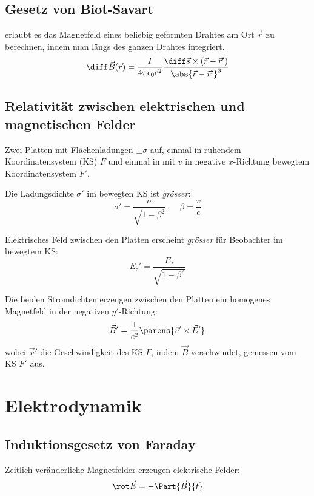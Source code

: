 	\subsection{Gesetz von Biot-Savart} %
		erlaubt es das Magnetfeld eines beliebig geformten Drahtes am Ort $\vec r$ zu berechnen, indem man längs des ganzen Drahtes integriert.
		\begin{equation*}
			\diff \vec B(\vec r) = \frac{I}{4\pi\epsilon_0 c^2} \frac{\diff \vec s \times (\vec r - \vec r')}{\abs{\vec r - \vec r'}^3}
		\end{equation*}
		
		
	\subsection{Relativität zwischen elektrischen und magnetischen Felder} %
		Zwei Platten mit Flächenladungen $\pm\sigma$ auf, einmal in ruhendem Koordinatensystem (KS) $F$ und einmal in mit $v$ in negative $x$-Richtung bewegtem Koordinatensystem $F'$.
		
		Die Ladungsdichte $\sigma'$ im bewegten KS ist \emph{grösser}:
		\begin{equation*}
			\sigma' = \frac{\sigma}{\sqrt{1-\beta^2}}\,,\quad \beta = \frac{v}{c}
		\end{equation*}
		
		Elektrisches Feld zwischen den Platten erscheint \emph{grösser} für Beobachter im bewegtem KS:
		\begin{equation*}
			E_z' = \frac{E_z}{\sqrt{1-\beta^2}}
		\end{equation*}
		
		Die beiden Stromdichten erzeugen zwischen den Platten ein homogenes Magnetfeld in der negativen $y'$-Richtung:
		\begin{equation*}
			\vec B' = \frac{1}{c^2}\parens{\vec v' \times \vec E'}
		\end{equation*}
		wobei $\vec v'$ die Geschwindigkeit des KS $F$, indem $\vec B$ verschwindet, gemessen vom KS $F'$ aus.
\section{Elektrodynamik} %
	\subsection{Induktionsgesetz von Faraday} %
		Zeitlich veränderliche Magnetfelder erzeugen elektrische Felder:
		\begin{equation*}
			\rot \vec E = - \Part{\vec B}{t}
		\end{equation*}
		
